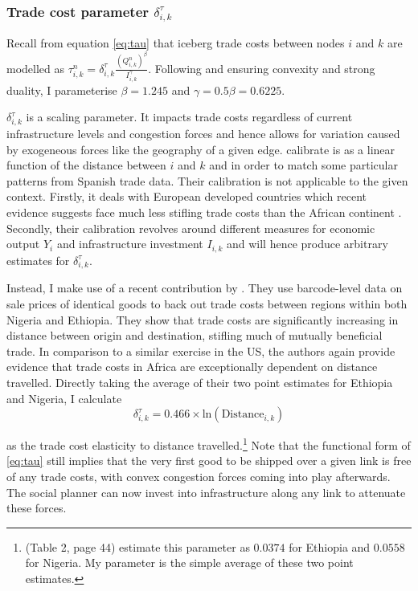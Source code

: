 \documentclass[11pt, oneside]{article}   	%
\begin{document}
\subsubsection{Trade cost parameter $\delta_{i,k}^{\tau}$}
Recall from equation \eqref{eq:tau} that iceberg trade costs between nodes $i$ and $k$ are modelled as $\tau_{i,k}^{n} = \delta^{\tau}_{i, k} \frac{(Q_{i,k}^{n})^{\beta}}{I_{i,k}^{\gamma}}$. Following \citeauthor{fajgelbaum_optimal_2017} and ensuring convexity and strong duality, I parameterise $\beta = 1.245$ and $\gamma = 0.5\beta = 0.6225$.

$\delta^{\tau}_{i, k}$ is a scaling parameter. It impacts trade costs regardless of current infrastructure levels and congestion forces and hence allows for variation caused by exogeneous forces like the geography of a given edge. \citeauthor{fajgelbaum_optimal_2017} calibrate is as a linear function of the distance between $i$ and $k$ and in order to match some particular patterns from Spanish trade data. Their calibration is not applicable to the given context. Firstly, it deals with European developed countries which recent evidence suggests face much less stifling trade costs than the African continent \citep[see e.g.][]{Anderson_Tradecosts_2004}. Secondly, their calibration revolves around different measures for economic output $Y_{i}$ and infrastructure investment $I_{i,k}$ and will hence produce arbitrary estimates for $\delta^{\tau}_{i, k}$.

Instead, I make use of a recent contribution by \cite{atkin_whos_2015}. They use barcode-level data on sale prices of identical goods to back out trade costs between regions within both Nigeria and Ethiopia. They show that trade costs are significantly increasing in distance between origin and destination, stifling much of mutually beneficial trade. In comparison to a similar exercise in the US, the authors again provide evidence that trade costs in Africa are exceptionally dependent on distance travelled. Directly taking the average of their two point estimates for Ethiopia and Nigeria, I calculate
\begin{equation}
  \delta^{\tau}_{i,k} =  0.466\times\textrm{ln}(\textrm{Distance}_{i,k})
  \label{eq:delta_tau}
\end{equation}

as the trade cost elasticity to distance travelled.\footnote{\citeauthor{atkin_whos_2015} (Table 2, page 44) estimate this parameter as $0.0374$ for Ethiopia and $0.0558$ for Nigeria. My parameter is the simple average of these two point estimates.} Note that the functional form of \eqref{eq:tau} still implies that the very first good to be shipped over a given link is free of any trade costs, with convex congestion forces coming into play  afterwards. The social planner can now invest into infrastructure along any link to attenuate these forces.
\end{document}
